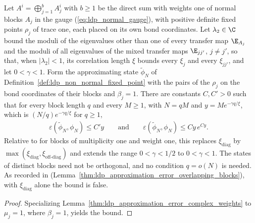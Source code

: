 \begin{lemma}
    \label{thm:ldp_approximation_error_overlapping_corrected}
    \leanok
    Let $A^i=\bigoplus_{j=1}^bA_j^i$ with $b\geq1$ be the direct sum with weights one
    of normal blocks $A_j$ in the gauge (\ref{eq:ldp_normal_gauge}), with positive
    definite fixed points $\rho_j$ of trace one, each placed on its own bond
    coordinates. Let $\lambda_2\in\C$ bound the moduli of the eigenvalues other than one
    of every transfer map $\E_{A_j}$ and the moduli of all eigenvalues of the mixed
    transfer maps $\E_{jj'}$, $j\neq j'$, so that, when $\lvert\lambda_2\rvert<1$, its
    correlation length $\xi$ bounds every $\xi_j$ and every $\xi_{jj'}$, and let
    $0<\gamma<1$. Form the
    approximating state $\widetilde\phi_N$ of
    Definition~\ref{def:ldp_non_normal_fixed_point} with the pairs of the $\rho_j$ on
    the bond coordinates of their blocks and $\beta_j=1$. There are constants $C,C'>0$
    such that for every block length $q$ and every $M\geq1$, with $N=qM$ and
    $y=Me^{-\gamma q/\xi}$, which is $(N/q)e^{-\gamma q/\xi}$ for $q\geq1$,
    \begin{align}
        \varepsilon(\widetilde\phi_N,\phi_N)\leq C'y
        \qquad\text{and}\qquad
        \varepsilon(\widetilde\phi_N,\phi_N)\leq Cy\,e^{Cy}.
        \label{eq:ldp_approximation_error_overlapping_corrected}
    \end{align}
    Relative to \cite[Lemma~1$'$(ii)]{Malz2024Preparation} for blocks of multiplicity one
    and weight one, this replaces $\xi_{\mathrm{diag}}$ by
    $\max(\xi_{\mathrm{diag}},\xi_{\mathrm{off\text{-}diag}})$ and extends the range
    $0<\gamma<1/2$ to $0<\gamma<1$. The states of distinct
    blocks need not be orthogonal, and no condition $q=o(N)$ is needed. As recorded
    in \cite{gap:mswc24_block_form_mixed_overlap}
    (Lemma~\ref{thm:ldp_approximation_error_overlapping_blocks}), with
    $\xi_{\mathrm{diag}}$ alone the bound is false.
\end{lemma}
\begin{proof}
    \leanok
    Specializing Lemma~\ref{thm:ldp_approximation_error_complex_weights} to
    $\mu_j=1$, where $\beta_j=1$, yields the bound.
\end{proof}

